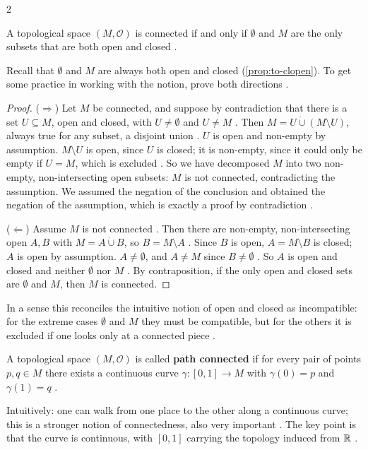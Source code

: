 \begin{paracol}{2}
\begin{theorem}\label{thm:iv-clopen}
A topological space $(M,\mathcal O)$ is connected if and only if $\emptyset$ and $M$ are the only subsets that are both open and closed .
\end{theorem}
Recall that $\emptyset$ and $M$ are always both open and closed (\cref{prop:to-clopen}). To get some practice in working with the notion, prove both directions .
\begin{proof}
($\Rightarrow$) Let $M$ be connected, and suppose by contradiction that there is a set $U\subseteq M$, open and closed, with $U\ne\emptyset$ and $U\ne M$ .
Then $M=U\mathbin{\dot\cup}(M\setminus U)$, always true for any subset, a disjoint union . $U$ is open and non-empty by assumption. $M\setminus U$ is open, since
$U$ is closed; it is non-empty, since it could only be empty if $U=M$, which is excluded . So we have decomposed $M$ into
two non-empty, non-intersecting open subsets: $M$ is not connected, contradicting the assumption. We assumed the negation of the conclusion and obtained the negation of the assumption,
which is exactly a proof by contradiction .

($\Leftarrow$) Assume $M$ is not connected . Then there are non-empty, non-intersecting open $A,B$ with $M=A\mathbin{\dot\cup}B$, so $B=M\setminus A$
. Since $B$ is open, $A=M\setminus B$ is closed; $A$ is open by assumption. $A\ne\emptyset$, and $A\ne M$ since $B\ne\emptyset$
. So $A$ is open and closed and neither $\emptyset$ nor $M$ . By contraposition, if
the only open and closed sets are $\emptyset$ and $M$, then $M$ is connected.
\end{proof}
In a sense this reconciles the intuitive notion of open and closed as incompatible: for the extreme cases $\emptyset$ and $M$ they must be compatible, but for the others it is excluded if one looks only at a connected piece
.

\begin{definition}\label{def:iv-path}
A topological space $(M,\mathcal O)$ is called \textbf{path connected} if for every pair of points $p,q\in M$ there exists a continuous curve $\gamma\colon[0,1]\to M$ with $\gamma(0)=p$ and $\gamma(1)=q$
.
\end{definition}
Intuitively: one can walk from one place to the other along a continuous curve; this is a stronger notion of connectedness, also very important . The key point is that the curve is continuous, with
$[0,1]$ carrying the topology induced from $\mathbb{R}$ .


\end{paracol}
